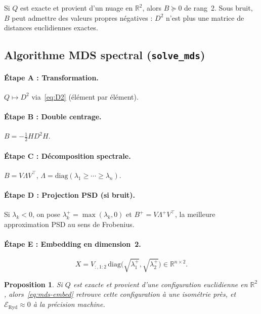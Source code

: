 \documentclass[11pt,a4paper]{article}
\newtheorem{proposition}[theorem]{Proposition}
\theoremstyle{definition}
\theoremstyle{remark}
\newcommand{\R}{\mathbb{R}}
\newcommand{\Eryd}{\mathcal{E}_{\mathrm{Ryd}}}
\begin{document}
Si $Q$ est exacte et provient d'un nuage en $\R^2$, alors $B \succeq 0$ de
rang~2. Sous bruit, $B$ peut admettre des valeurs propres négatives : $D^2$
n'est plus une matrice de distances euclidiennes exactes.

\subsection{Algorithme MDS spectral (\texttt{solve\_mds})}
\label{sec:mds-algo}

\paragraph{Étape A : Transformation.}
$Q \mapsto D^2$ via~\eqref{eq:D2} (élément par élément).

\paragraph{Étape B : Double centrage.}
$B = -\tfrac{1}{2} H D^2 H$.

\paragraph{Étape C : Décomposition spectrale.}
$B = V \Lambda V^\top$,
$\Lambda = \mathrm{diag}(\lambda_1 \geq \cdots \geq \lambda_n)$.

\paragraph{Étape D : Projection PSD (si bruit).}
Si $\lambda_k < 0$, on pose $\lambda_k^+ = \max(\lambda_k, 0)$ et
$B^+ = V \Lambda^+ V^\top$, la meilleure approximation PSD au sens de
Frobenius.

\paragraph{Étape E : Embedding en dimension~2.}
\begin{equation}
  X = V_{:,1:2}\,\mathrm{diag}\!\bigl(\sqrt{\lambda_1^+},\sqrt{\lambda_2^+}\bigr)
  \in \R^{n \times 2}.
  \label{eq:mds-embed}
\end{equation}

\begin{proposition}
Si $Q$ est exacte et provient d'une configuration euclidienne en
$\R^2$, alors~\eqref{eq:mds-embed} retrouve cette configuration à une
isométrie près, et $\Eryd \approx 0$ à la précision machine.
\end{proposition}
\end{document}
